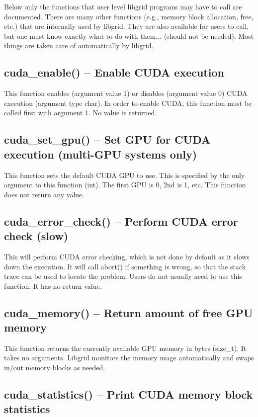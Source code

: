 \documentclass[12pt,letterpaper]{report}
\begin{document}
Below only the functions that user level libgrid programs may have to call are documented. There are many other functions (e.g., memory block allocation, free, etc.) that are internally used by libgrid. They are also available for users to call, but one must know exactly what to do with them... (should not be needed). Most things are taken care of automatically by libgrid.

\subsection{cuda\_enable() -- Enable CUDA execution}

This function enables (argument value 1) or disables (argument value 0) CUDA execution (argument type char). In order to enable CUDA, this function must be called first with argument 1. No value is returned.

\subsection{cuda\_set\_gpu() -- Set GPU for CUDA execution (multi-GPU systems only)}

This function sets the default CUDA GPU to use. This is specified by the only argument to this function (int). The first GPU is 0, 2nd is 1, etc. This function does not return any value.

\subsection{cuda\_error\_check() -- Perform CUDA error check (slow)}

This will perform CUDA error checking, which is not done by default as it slows down the execution. It will call abort() if something is wrong, so that the stack trace can be used to locate the problem. Users do not usually need to use this function. It has no return value.

\subsection{cuda\_memory() -- Return amount of free GPU memory}

This function returns the currently available GPU memory in bytes (size\_t). It takes no arguments. Libgrid monitors the memory usage automatically and swaps in/out memory blocks as needed.

\subsection{cuda\_statistics() -- Print CUDA memory block statistics}
\end{document}
